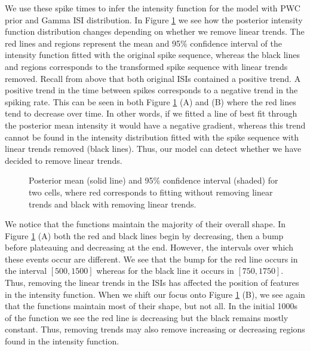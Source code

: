 \documentclass[12pt]{book} %
\begin{document}
We use these  spike times to infer the intensity function for the model with PWC prior and Gamma ISI distribution. In Figure \ref{fig:Trends} we see how the posterior intensity function distribution changes depending on whether we remove linear trends. The red lines and regions represent the mean and 95\% confidence interval of the intensity function fitted with the original  spike sequence, whereas the black lines and regions corresponds to the transformed  spike sequence with linear trends removed. Recall from above that both original ISIs contained a positive trend. A positive trend in the time between  spikes corresponds to a negative trend in the spiking rate. This can be seen in both Figure \ref{fig:Trends} (A) and (B) where the red lines tend to decrease over time. In other words, if we fitted a line of best fit through the posterior mean intensity it would have a negative gradient, whereas this trend cannot be found in the intensity distribution fitted with the  spike sequence with linear trends removed (black lines). Thus, our model can detect whether we have decided to remove linear trends.

 \begin{figure}[t!]
   \hrulefill
   \begin{center} 
     \quad
    \end{center}     
    \caption{Posterior mean (solid line) and 95\% confidence interval (shaded) for two cells, where red corresponds to fitting  without removing linear trends and black with removing linear trends.}
    \label{fig:Trends}
    \hrulefill
    \end{figure}
    
 We notice that the functions maintain the majority of their overall shape. In Figure \ref{fig:Trends} (A) both the red and black lines begin by decreasing, then a bump before plateauing and decreasing at the end. However, the intervals over which these events occur are different. We see that the bump for the red line  occurs in the interval $[500,1500]$ whereas for the black line it occurs in $[750,1750]$. Thus, removing the linear trends in the ISIs has affected the position of features in the intensity function. When we shift our focus onto Figure \ref{fig:Trends} (B), we see again that the functions maintain most of their shape, but not all. In the initial 1000s of the function we see the red line is decreasing but the black remains mostly constant. Thus, removing trends may also remove increasing or decreasing regions found in the intensity function.
 
\end{document}
